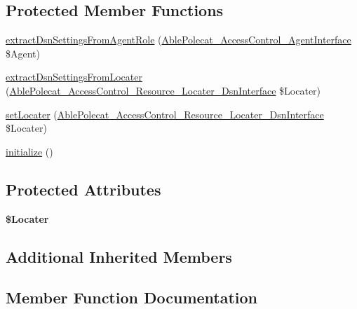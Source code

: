 \subsection*{Protected Member Functions}
\begin{DoxyCompactItemize}
\item 
\hyperlink{class_able_polecat___database_abstract_af1fa6f96b1716cfbc62d7f6557324709}{extract\+Dsn\+Settings\+From\+Agent\+Role} (\hyperlink{interface_able_polecat___access_control___agent_interface}{Able\+Polecat\+\_\+\+Access\+Control\+\_\+\+Agent\+Interface} \$Agent)
\item 
\hyperlink{class_able_polecat___database_abstract_a806d4cf90bcf087102416eabc468783d}{extract\+Dsn\+Settings\+From\+Locater} (\hyperlink{interface_able_polecat___access_control___resource___locater___dsn_interface}{Able\+Polecat\+\_\+\+Access\+Control\+\_\+\+Resource\+\_\+\+Locater\+\_\+\+Dsn\+Interface} \$Locater)
\item 
\hyperlink{class_able_polecat___database_abstract_ac30bce81b062d34591a9ed8387c360d4}{set\+Locater} (\hyperlink{interface_able_polecat___access_control___resource___locater___dsn_interface}{Able\+Polecat\+\_\+\+Access\+Control\+\_\+\+Resource\+\_\+\+Locater\+\_\+\+Dsn\+Interface} \$Locater)
\item 
\hyperlink{class_able_polecat___database_abstract_a91098fa7d1917ce4833f284bbef12627}{initialize} ()
\end{DoxyCompactItemize}
\subsection*{Protected Attributes}
\begin{DoxyCompactItemize}
\item 
\hypertarget{class_able_polecat___database_abstract_a19ea8cf80a6a5550cb509826cee11ec3}{}{\bfseries \$\+Locater}\label{class_able_polecat___database_abstract_a19ea8cf80a6a5550cb509826cee11ec3}

\end{DoxyCompactItemize}
\subsection*{Additional Inherited Members}


\subsection{Member Function Documentation}
\hypertarget{class_able_polecat___database_abstract_af1fa6f96b1716cfbc62d7f6557324709}{}
